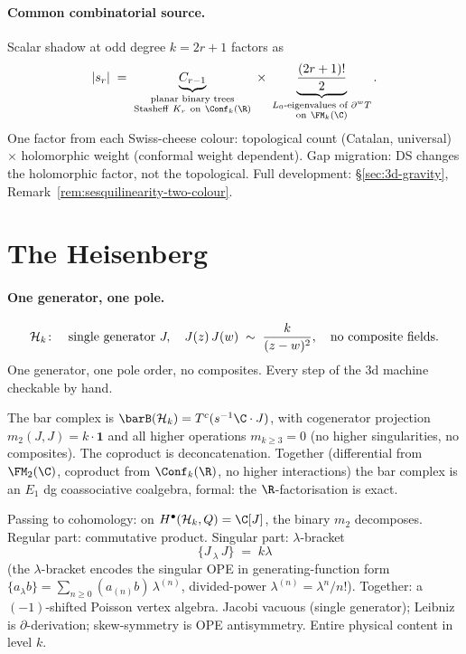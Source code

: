 \paragraph{Common combinatorial source.}
Scalar shadow at odd degree $k = 2r + 1$ factors as
\[
 |s_r| \;=\;
 \underbrace{C_{r-1}}_{\substack{\text{planar binary trees} \\ \text{Stasheff}\ K_r\ \text{on}\ \Conf_k(\R)}}
 \;\times\;
 \underbrace{\frac{(2r+1)!}{2}}_{\substack{L_0\text{-eigenvalues of } \partial^w T \\ \text{on}\ \FM_k(\C)}}.
\]
One factor from each Swiss-cheese colour: topological count
(Catalan, universal) $\times$ holomorphic weight (conformal
weight dependent). Gap migration: DS changes the holomorphic
factor, not the topological. Full development:
\S\ref{sec:3d-gravity}, Remark~\ref{rem:sesquilinearity-two-colour}.

\section*{The Heisenberg}

\paragraph{One generator, one pole.}
\[
 \mathcal{H}_k\colon \quad
 \text{single generator } J,
 \quad
 J(z)\, J(w) \;\sim\; \frac{k}{(z-w)^2},
 \quad
 \text{no composite fields}.
\]
One generator, one pole order, no composites. Every step of the
3d machine checkable by hand.

The bar complex is $\barB(\cH_k) = T^c(s^{-1}\C \cdot J)$, with
cogenerator projection
$m_2(J, J) = k \cdot \mathbf{1}$
and all higher operations $m_{k \ge 3} = 0$ (no higher
singularities, no composites). The coproduct is deconcatenation.
Together (differential from $\FM_2(\C)$, coproduct from
$\Conf_k(\R)$, no higher interactions) the bar complex is an
$E_1$ dg coassociative coalgebra, formal: the $\R$-factorisation
is exact.

Passing to cohomology: on $H^\bullet(\cH_k, Q) = \C[J]$, the
binary $m_2$ decomposes. Regular part: commutative product.
Singular part: $\lambda$-bracket
\[
\{J \,{}_\lambda\, J\} \;=\; k\lambda
\]
(the $\lambda$-bracket encodes the singular OPE in
generating-function form
$\{a {}_\lambda b\} = \sum_{n \ge 0} (a_{(n)} b)\, \lambda^{(n)}$,
divided-power $\lambda^{(n)} = \lambda^n/n!$). Together: a
$(-1)$-shifted Poisson vertex algebra. Jacobi vacuous (single
generator); Leibniz is $\partial$-derivation; skew-symmetry is
OPE antisymmetry. Entire physical content in level $k$.

